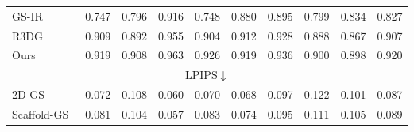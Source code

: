 \begin{table*}[h]
{\begin{tabular}{lccccccccc}
GS-IR~\cite{liang2024gs} & 0.747 & 0.796 & 0.916 & 0.748 & 0.880 & 0.895 & 0.799 & 0.834    & 0.827  \\ 

R3DG~\cite{gao2023relightable}    &  0.909                    & 0.892                    &   0.955                 &  0.904                  &   0.912                      &  0.928                   &    0.888                  &   0.867  &  0.907                                                                                                                                                                                                                                                                     \\

Ours & \cellcolor{yzysecond}0.919                          & \cellcolor{yzysecond}0.908                          & \cellcolor{yzybest}0.963                         & \cellcolor{yzysecond}0.926                        & \cellcolor{yzybest}0.919                             & \cellcolor{yzybest}0.936                       & \cellcolor{yzythird}0.900                           & \cellcolor{yzybest}0.898  &  \cellcolor{yzysecond}0.920                                                                                                                                                                                                 
 \\ \hline
 
\multicolumn{10}{c}{LPIPS$\downarrow$}                                                                                                                                                                                                                                              \\ \hline
2D-GS~\cite{Huang2DGS2024}        & \cellcolor{yzythird}0.072                     & 0.108                     & 0.060                   & \cellcolor{yzythird}0.070                   & 0.068                         & 0.097                    & \cellcolor{yzythird}0.122                      & \cellcolor{yzythird}0.101  &  \cellcolor{yzysecond}0.087                          \\

Scaffold-GS~\cite{lu2024scaffold}      & 0.081                     & \cellcolor{yzythird}0.104                     & \cellcolor{yzysecond}0.057                 & 0.083                  & 0.074                         & \cellcolor{yzysecond}0.095                    & \cellcolor{yzybest}0.111                     & 0.105 & 0.089                  \\


\end{tabular}}
\end{table*}
